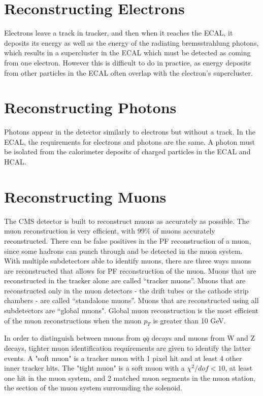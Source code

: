 \section{Reconstructing Electrons}

Electrons leave a track in tracker, and then when it reaches the ECAL, it deposits its energy as well as the energy of the radiating bremsstrahlung photons, which results in a supercluster in the ECAL which must be detected as coming from one electron. However this is difficult to do in practice, as energy deposits from other particles in the ECAL often overlap with the electron’s supercluster.


\section{Reconstructing Photons}

Photons appear in the detector similarly to electrons but without a track. In the ECAL, the requirements for electrons and photons are the same. A photon must be isolated from the calorimeter deposits of charged particles in the ECAL and HCAL.

\section{Reconstructing Muons}

The CMS detector is built to reconstruct muons as accurately as possible. The muon reconstruction is very efficient, with 99\% of muons accurately reconstructed. There can be false positives in the PF reconstruction of a muon, since some hadrons can punch through and be detected in the muon system. With multiple subdetectors able to identify muons, there are three ways muons are reconstructed that allows for PF reconstruction of the muon. Muons that are reconstructed in the tracker alone are called “tracker muons”. Muons that are reconstructed only in the muon detectors - the drift tubes or the cathode strip chambers - are called “standalone muons”. Muons that are reconstructed using all subdetectors are “global muons". Global muon reconstruction is the most efficient of the muon reconstructions when the muon $p_T$ is greater than 10 GeV.

In order to distinguish between muons from $q\bar{q}$ decays and muons from W and Z decays, tighter muon identification requirements are given to identify the latter events. A "soft muon" is a tracker muon with 1 pixel hit and at least 4 other inner tracker hits. The "tight muon" is a soft muon with a $\chi^2/dof < 10$, at least one hit in the muon system, and 2 matched muon segments in the muon station, the section of the muon system surrounding the solenoid.


